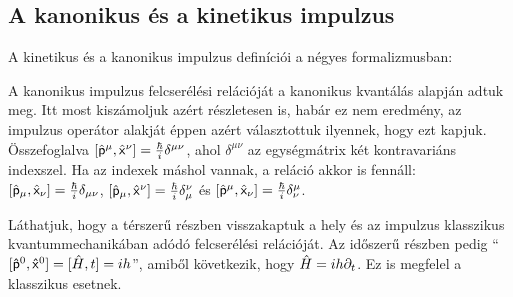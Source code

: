  \subsection{A kanonikus és a kinetikus impulzus}\label{ss:05-kankinimp}
   
   A kinetikus és a kanonikus impulzus definíciói a négyes formalizmusban:
   
   A kanonikus impulzus felcserélési relációját a kanonikus kvantálás alapján adtuk meg. Itt most kiszámoljuk azért részletesen is, habár ez nem eredmény, az impulzus operátor alakját éppen azért választottuk ilyennek, hogy ezt kapjuk. 
   Összefoglalva $[\hat{\mathsf{p}}^\mu,\hat{\mathsf{x}}^\nu]=\frac{\hbar}{i}\delta^{\mu\nu}$, ahol $\delta^{\mu\nu}$ az egységmátrix két kontravariáns indexszel.
   Ha az indexek máshol vannak, a reláció akkor is fennáll: $[\hat{\mathsf{p}}_\mu,\hat{\mathsf{x}}_\nu]=\frac{\hbar}{i}\delta_{\mu\nu}$, $[\hat{\mathsf{p}}_\mu,\hat{\mathsf{x}}^\nu]=\frac{\hbar}{i}\delta^{\nu}_\mu$ és $[\hat{\mathsf{p}}^\mu,\hat{\mathsf{x}}_\nu]=\frac{\hbar}{i}\delta^\mu_\nu$.
   
   Láthatjuk, hogy a térszerű részben visszakaptuk a hely és az impulzus klasszikus kvantummechanikában adódó felcserélési relációját. Az időszerű részben pedig ``$[\mathsf{\hat{p}}^0,\mathsf{\hat{x}}^0]=[\hat{H},t]=ih$'', amiből következik, hogy $\hat{H}=ih\partial_t$. Ez is megfelel a klasszikus esetnek.
   
